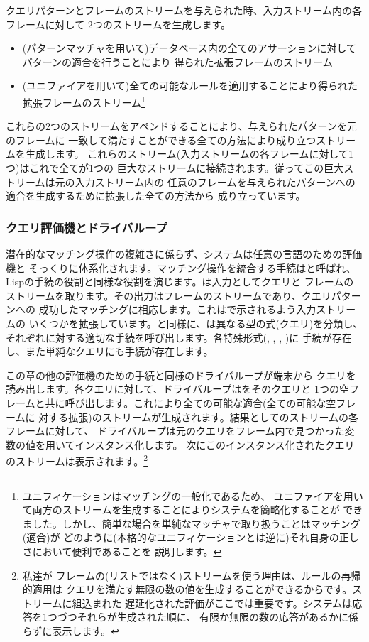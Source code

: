 クエリパターンとフレームのストリームを与えられた時、入力ストリーム内の各フレームに対して
2つのストリームを生成します。

\begin{itemize}

\item
(パターンマッチャを用いて)データベース内の全てのアサーションに対してパターンの適合を行うことにより
得られた拡張フレームのストリーム

\item
(ユニファイアを用いて)全ての可能なルールを適用することにより得られた
拡張フレームのストリーム\footnote{ユニフィケーションはマッチングの一般化であるため、
ユニファイアを用いて両方のストリームを生成することによりシステムを簡略化することが
できました。しかし、簡単な場合を単純なマッチャで取り扱うことはマッチング(適合)が
どのように(本格的なユニフィケーションとは逆に)それ自身の正しさにおいて便利であることを
説明します。}

\end{itemize}

\noindent
これらの2つのストリームをアペンドすることにより、与えられたパターンを元のフレームに
一致して満たすことができる全ての方法により成り立つストリームを生成します。
これらのストリーム(入力ストリームの各フレームに対して1つ)はこれで全てが1つの
巨大なストリームに接続されます。従ってこの巨大ストリームは元の入力ストリーム内の
任意のフレームを与えられたパターンへの適合を生成するために拡張した全ての方法から
成り立っています。

\subsubsection*{クエリ評価機とドライバループ}

潜在的なマッチング操作の複雑さに係らず、システムは任意の言語のための評価機と
そっくりに体系化されます。マッチング操作を統合する手続はと呼ばれ、
Lispの手続の役割と同様な役割を演じます。は入力としてクエリと
フレームのストリームを取ります。その出力はフレームのストリームであり、クエリパターンへの
成功したマッチングに相応します。これはで示されるよう入力ストリームの
いくつかを拡張しています。と同様に、は異なる型の式(クエリ)を分類し、
それぞれに対する適切な手続を呼び出します。各特殊形式(, , , )に
手続が存在し、また単純なクエリにも手続が存在します。

この章の他の評価機のための手続と同様のドライバループが端末から
クエリを読み出します。各クエリに対して、ドライバループはをそのクエリと
1つの空フレームと共に呼び出します。これにより全ての可能な適合(全ての可能な空フレームに
対する拡張)のストリームが生成されます。結果としてのストリームの各フレームに対して、
ドライバループは元のクエリをフレーム内で見つかった変数の値を用いてインスタンス化します。
次にこのインスタンス化されたクエリのストリームは表示されます。\footnote{私達が
フレームの(リストではなく)ストリームを使う理由は、ルールの再帰的適用は
クエリを満たす無限の数の値を生成することができるからです。ストリームに組込まれた
遅延化された評価がここでは重要です。システムは応答を1つづつそれらが生成された順に、
有限か無限の数の応答があるかに係らずに表示します。}

